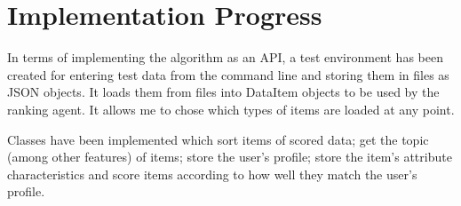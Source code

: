 \section{Implementation Progress}

In terms of implementing the algorithm as an API, a test environment has been created for entering test data from the command line and storing them in files as JSON objects. It loads them from files into DataItem objects to be used by the ranking agent. It allows me to chose which types of items are loaded at any point. 

Classes have been implemented which sort items of scored data; get the topic (among other features) of items; store the user's profile; store the item's attribute characteristics and score items according to how well they match the user's profile. 